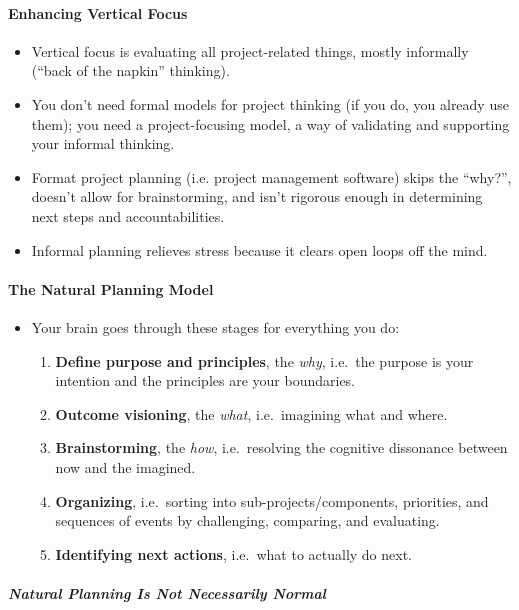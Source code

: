\documentclass{article}
\begin{document}
\paragraph{Enhancing Vertical Focus}

\begin{itemize}
  \item Vertical focus is evaluating all project-related things, mostly informally (``back of the napkin'' thinking).
  \item You don't need formal models for project thinking (if you do, you already use them); you need a project-focusing model, a way of validating and supporting your informal thinking.
  \item Format project planning (i.e. project management software) skips the ``why?'', doesn't allow for brainstorming, and isn't rigorous enough in determining next steps and accountabilities.
  \item Informal planning relieves stress because it clears open loops off the mind.
\end{itemize}

\paragraph{The Natural Planning Model}

\begin{itemize}
  \item Your brain goes through these stages for everything you do:
  \begin{enumerate}
      \item \textbf{Define purpose and principles}, the \textit{why}, i.e.\ the purpose is your intention and the principles are your boundaries.
      \item \textbf{Outcome visioning}, the \textit{what}, i.e.\ imagining what and where.
      \item \textbf{Brainstorming}, the \textit{how}, i.e.\ resolving the cognitive dissonance between now and the imagined.
      \item \textbf{Organizing}, i.e.\ sorting into sub-projects/components, priorities, and sequences of events by challenging, comparing, and evaluating.
      \item \textbf{Identifying next actions}, i.e.\ what to actually do next.
  \end{enumerate}
\end{itemize}

\subparagraph{Natural Planning Is Not Necessarily Normal}
\end{document}
